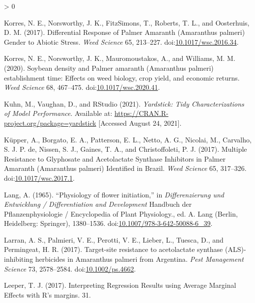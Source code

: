 \documentclass[utf8]{frontiersSCNS}
\newlength{\cslhangindent}
\newenvironment{CSLReferences}[2] %
 {%
  \setlength{\parindent}{0pt}
  \ifodd #1 \everypar{\setlength{\hangindent}{\cslhangindent}}\ignorespaces\fi
  \ifnum #2 > 0
  \setlength{\parskip}{#2\baselineskip}
  \fi
 }%
 {}
\begin{document}
\begin{CSLReferences}{1}{0}
\leavevmode\hypertarget{ref-korres2017}{}%
Korres, N. E., Norsworthy, J. K., FitzSimons, T., Roberts, T. L., and
Oosterhuis, D. M. (2017). Differential {Response} of {Palmer Amaranth}
({Amaranthus} palmeri) {Gender} to {Abiotic Stress}. \emph{Weed Science}
65, 213--227.
doi:\href{https://doi.org/10.1017/wsc.2016.34}{10.1017/wsc.2016.34}.

\leavevmode\hypertarget{ref-korres2020}{}%
Korres, N. E., Norsworthy, J. K., Mauromoustakos, A., and Williams, M.
M. (2020). Soybean density and {Palmer} amaranth ({Amaranthus} palmeri)
establishment time: Effects on weed biology, crop yield, and economic
returns. \emph{Weed Science} 68, 467--475.
doi:\href{https://doi.org/10.1017/wsc.2020.41}{10.1017/wsc.2020.41}.

\leavevmode\hypertarget{ref-kuhn2021}{}%
Kuhn, M., Vaughan, D., and RStudio (2021). \emph{Yardstick: {Tidy
Characterizations} of {Model Performance}}. Available at:
\url{https://CRAN.R-project.org/package=yardstick} {[}Accessed August
24, 2021{]}.

\leavevmode\hypertarget{ref-kupper2017}{}%
Küpper, A., Borgato, E. A., Patterson, E. L., Netto, A. G., Nicolai, M.,
Carvalho, S. J. P. de, Nissen, S. J., Gaines, T. A., and Christoffoleti,
P. J. (2017). Multiple {Resistance} to {Glyphosate} and {Acetolactate
Synthase Inhibitors} in {Palmer Amaranth} ({Amaranthus} palmeri)
{Identified} in {Brazil}. \emph{Weed Science} 65, 317--326.
doi:\href{https://doi.org/10.1017/wsc.2017.1}{10.1017/wsc.2017.1}.

\leavevmode\hypertarget{ref-lang1965}{}%
Lang, A. (1965). {``Physiology of flower initiation,''} in
\emph{Differenzierung und {Entwicklung} / {Differentiation} and
{Development}} Handbuch der {Pflanzenphysiologie} / {Encyclopedia} of
{Plant Physiology}., ed. A. Lang ({Berlin, Heidelberg}: {Springer}),
1380--1536.
doi:\href{https://doi.org/10.1007/978-3-642-50088-6_39}{10.1007/978-3-642-50088-6\_39}.

\leavevmode\hypertarget{ref-larran2017}{}%
Larran, A. S., Palmieri, V. E., Perotti, V. E., Lieber, L., Tuesca, D.,
and Permingeat, H. R. (2017). Target-site resistance to acetolactate
synthase ({ALS})-inhibiting herbicides in {Amaranthus} palmeri from
{Argentina}. \emph{Pest Management Science} 73, 2578--2584.
doi:\href{https://doi.org/10.1002/ps.4662}{10.1002/ps.4662}.

\leavevmode\hypertarget{ref-leeper2017}{}%
Leeper, T. J. (2017). Interpreting {Regression Results} using {Average
Marginal Eﬀects} with {R}'s margins. 31.


\end{CSLReferences}
\end{document}
